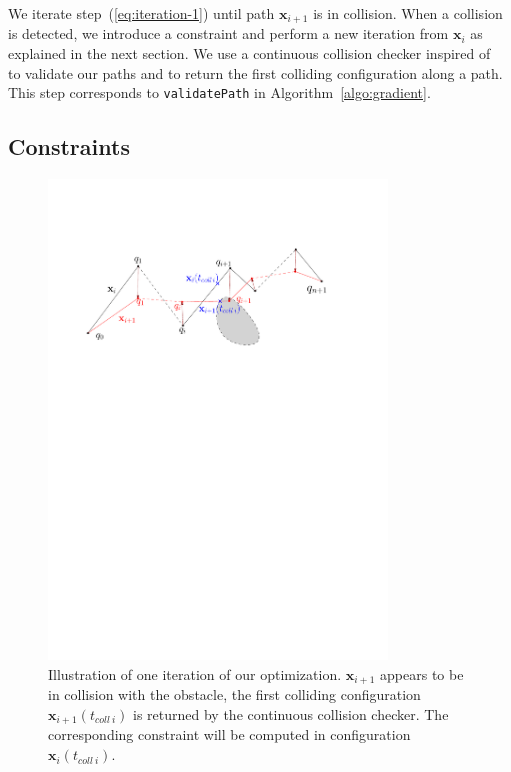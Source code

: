 \documentclass{tADR2e}
\newcommand\xx{\mathbf{x}}
\newcommand\tcolli{t_{coll\ i}}
\begin{document}
We iterate step~(\ref{eq:iteration-1}) until path $\xx_{i+1}$ is in collision. 
When a collision is detected, we introduce a constraint and perform a new 
iteration from $\xx_i$ as explained in the next section. We use a continuous 
collision checker inspired of~\cite{SchwarzerExactCollision} to validate our 
paths and to return the first colliding configuration along a path. This step corresponds to \texttt{validatePath} in Algorithm~\ref{algo:gradient}.

\subsection{Constraints}

\begin{figure}[t]
	\centering
	\includegraphics[width=9cm]{optim_grad.pdf}
	\caption{Illustration of one iteration of our optimization. $\xx_{i+1}$ 
	appears 
	to be in collision with the obstacle, the first colliding configuration 
	$\xx_{i+1}(\tcolli)$ is returned by the continuous collision checker. The corresponding constraint will be computed in configuration $\xx_{i}(\tcolli)$.}
	\label{optim_grad}
\end{figure}
\end{document}
